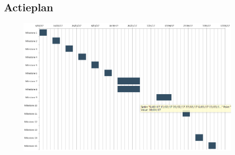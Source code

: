 
\begin{landscape}
	\chapter{Actieplan}
	\vspace{-3.5cm}
	\begin{figure}[H]
		\centering
		\includegraphics[width=1.5\textwidth]{Figuren/GanttChartDark.png}
	\end{figure}
\end{landscape}